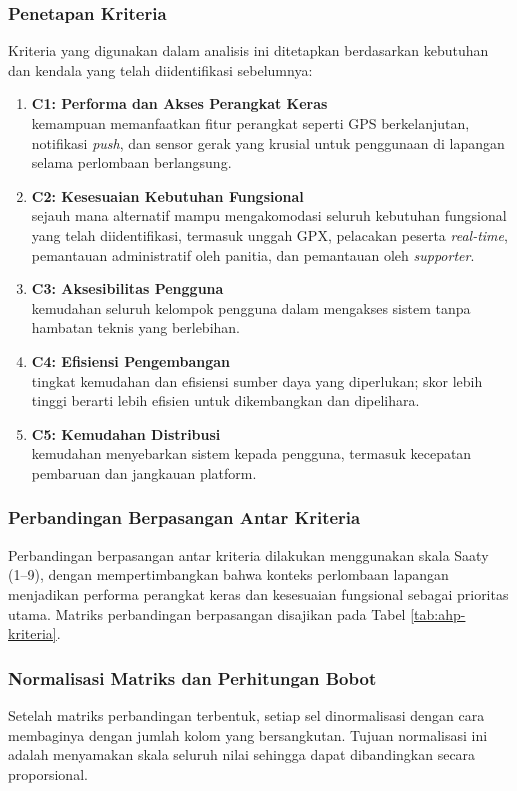\subsubsection{Penetapan Kriteria}
Kriteria yang digunakan dalam analisis ini ditetapkan berdasarkan kebutuhan dan kendala yang telah diidentifikasi sebelumnya:

\begin{enumerate}
  \item \textbf{C1: Performa dan Akses Perangkat Keras}\\
  kemampuan memanfaatkan fitur perangkat seperti GPS berkelanjutan, notifikasi \textit{push}, dan sensor gerak yang krusial untuk penggunaan di lapangan selama perlombaan berlangsung.
  \item \textbf{C2: Kesesuaian Kebutuhan Fungsional}\\
  sejauh mana alternatif mampu mengakomodasi seluruh kebutuhan fungsional yang telah diidentifikasi, termasuk unggah GPX, pelacakan peserta \textit{real-time}, pemantauan administratif oleh panitia, dan pemantauan oleh \textit{supporter}.
  \item \textbf{C3: Aksesibilitas Pengguna}\\
  kemudahan seluruh kelompok pengguna dalam mengakses sistem tanpa hambatan teknis yang berlebihan.
  \item \textbf{C4: Efisiensi Pengembangan}\\
  tingkat kemudahan dan efisiensi sumber daya yang diperlukan; skor lebih tinggi berarti lebih efisien untuk dikembangkan dan dipelihara.
  \item \textbf{C5: Kemudahan Distribusi}\\
  kemudahan menyebarkan sistem kepada pengguna, termasuk kecepatan pembaruan dan jangkauan platform.
\end{enumerate}

\subsubsection{Perbandingan Berpasangan Antar Kriteria}

Perbandingan berpasangan antar kriteria dilakukan menggunakan skala Saaty (1--9), dengan mempertimbangkan bahwa konteks perlombaan lapangan menjadikan performa perangkat keras dan kesesuaian fungsional sebagai prioritas utama. Matriks perbandingan berpasangan disajikan pada Tabel \ref{tab:ahp-kriteria}.


\subsubsection{Normalisasi Matriks dan Perhitungan Bobot}
Setelah matriks perbandingan terbentuk, setiap sel dinormalisasi dengan cara
membaginya dengan jumlah kolom yang bersangkutan. Tujuan normalisasi ini adalah
menyamakan skala seluruh nilai sehingga dapat dibandingkan secara proporsional.


